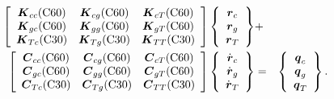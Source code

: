 \begin{eqnarray}
\left[ \begin{array}{ccc}
\mbox{\boldmath$K$}_{cc}{\rm(C60)} & \mbox{\boldmath$K$}_{cg}{\rm(C60)} & \mbox{\boldmath$K$}_{cT}{\rm(C60)} \\
\mbox{\boldmath$K$}_{gc}{\rm(C60)} & \mbox{\boldmath$K$}_{gg}{\rm(C60)} & \mbox{\boldmath$K$}_{gT}{\rm(C60)} \\
\mbox{\boldmath$K$}_{Tc}{\rm(C30)} & \mbox{\boldmath$K$}_{Tg}{\rm(C30)} & \mbox{\boldmath$K$}_{TT}{\rm(C30)}
\end{array} \right]
\left\{ \begin{array}{c}
\mbox{\boldmath$r$}_c \\
\mbox{\boldmath$r$}_g \\
\mbox{\boldmath$r$}_T
\end{array} \right\} &+& \nonumber\\ 
\left[ \begin{array}{ccc}
\mbox{\boldmath$C$}_{cc}{\rm(C60)} & \mbox{\boldmath$C$}_{cg}{\rm(C60)} & \mbox{\boldmath$C$}_{cT}{\rm(C60)} \\
\mbox{\boldmath$C$}_{gc}{\rm(C60)} & \mbox{\boldmath$C$}_{gg}{\rm(C60)} & \mbox{\boldmath$C$}_{gT}{\rm(C60)} \\
\mbox{\boldmath$C$}_{Tc}{\rm(C30)} & \mbox{\boldmath$C$}_{Tg}{\rm(C30)} & \mbox{\boldmath$C$}_{TT}{\rm(C30)}
\end{array} \right]
\left\{ \begin{array}{c}
\dot{\mbox{\boldmath$r$}}_c \\
\dot{\mbox{\boldmath$r$}}_g \\
\dot{\mbox{\boldmath$r$}}_T
\end{array} \right\} &=& 
\left\{ \begin{array}{c}
\mbox{\boldmath$q$}_c \\
\mbox{\boldmath$q$}_g \\
\mbox{\boldmath$q$}_T
\end{array} \right\}.
\end{eqnarray}

